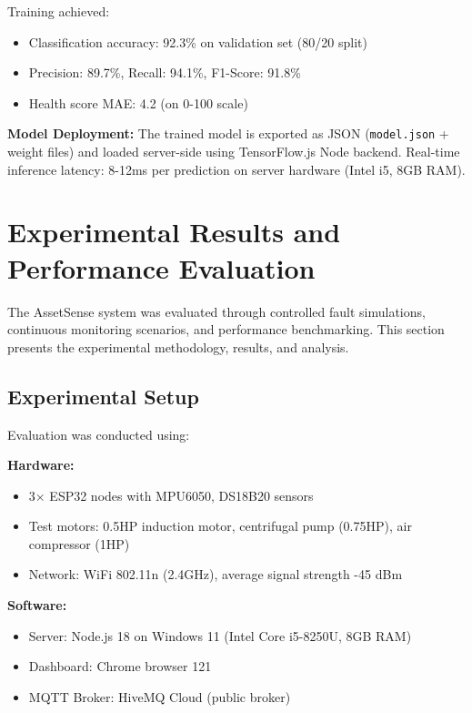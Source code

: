 \documentclass[conference]{IEEEtran}
\begin{document}
Training achieved:
\begin{itemize}
\item Classification accuracy: 92.3\% on validation set (80/20 split)
\item Precision: 89.7\%, Recall: 94.1\%, F1-Score: 91.8\%
\item Health score MAE: 4.2 (on 0-100 scale)
\end{itemize}

\textbf{Model Deployment:} The trained model is exported as JSON (\texttt{model.json} + weight files) and loaded server-side using TensorFlow.js Node backend. Real-time inference latency: 8-12ms per prediction on server hardware (Intel i5, 8GB RAM).

\section{Experimental Results and Performance Evaluation}

The AssetSense system was evaluated through controlled fault simulations, continuous monitoring scenarios, and performance benchmarking. This section presents the experimental methodology, results, and analysis.

\subsection{Experimental Setup}

Evaluation was conducted using:

\textbf{Hardware:}
\begin{itemize}
\item 3× ESP32 nodes with MPU6050, DS18B20 sensors
\item Test motors: 0.5HP induction motor, centrifugal pump (0.75HP), air compressor (1HP)
\item Network: WiFi 802.11n (2.4GHz), average signal strength -45 dBm
\end{itemize}

\textbf{Software:}
\begin{itemize}
\item Server: Node.js 18 on Windows 11 (Intel Core i5-8250U, 8GB RAM)
\item Dashboard: Chrome browser 121
\item MQTT Broker: HiveMQ Cloud (public broker)
\end{itemize}
\end{document}
